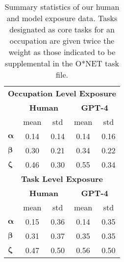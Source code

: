 \begin{table}[h!]\small\centering
\begin{tabular}{l c c c c}
  \toprule
  \multicolumn{5}{c}{\bfseries Occupation Level Exposure} \\
  \cmidrule{1-5}
  & \multicolumn{2}{c}{\bfseries Human} & \multicolumn{2}{c}{\bfseries GPT-4} \\
  \cmidrule(lr){2-3} \cmidrule(lr){4-5}
   & mean & std & mean & std \\
$\pmb{\alpha}$ & 0.14 & 0.14 & 0.14 & 0.16  \\
$\pmb{\beta}$ & 0.30 & 0.21 & 0.34 & 0.22 \\
$\pmb{\zeta}$ & 0.46 & 0.30 & 0.55 & 0.34 \\
  \midrule
  \multicolumn{5}{c}{\bfseries Task Level Exposure} \\
  \cmidrule{1-5}
  & \multicolumn{2}{c}{\textbf{Human}} & \multicolumn{2}{c}{\textbf{GPT-4}} \\
  \cmidrule(lr){2-3} \cmidrule(lr){4-5}
  & mean & std & mean & std \\
  $\pmb{\alpha}$ & 0.15 & 0.36 & 0.14 & 0.35 \\
  $\pmb{\beta}$ & 0.31 & 0.37 & 0.35 & 0.35 \\
  $\pmb{\zeta}$ & 0.47  & 0.50 & 0.56 & 0.50 \\
  \bottomrule
\end{tabular}
\caption{Summary statistics of our human and model exposure data. Tasks designated as core tasks for an occupation are given twice the weight as those indicated to be supplemental in the O*NET task file.}
\label{tab:summarystats}
\end{table}
  